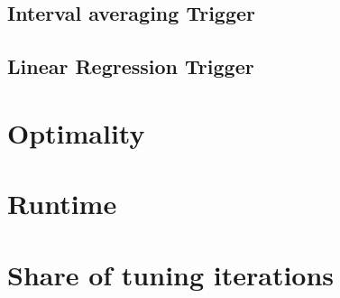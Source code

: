 \subsection{Interval averaging Trigger}
\subsection{Linear Regression Trigger}


\section{Optimality}
\section{Runtime}
\section{Share of tuning iterations}

